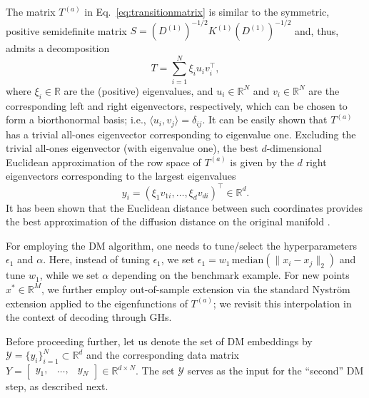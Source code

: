 \documentclass{article}
\begin{document}
The matrix $T^{(a)}$ in Eq.~\eqref{eq:transitionmatrix} is similar to the symmetric, positive semidefinite matrix $S=\left(D^{(1)}\right)^{-1/2} K^{(1)} \left(D^{(1)}\right)^{-1/2}$ and, thus, admits a decomposition
\begin{equation}
T=\sum_{i=1}^N \xi_i u_i v_{i}^\top, 
\end{equation}
where $\xi_i \in \mathbb{R}$ are the (positive) eigenvalues, and $u_i \in \mathbb{R}^N$ and $v_i \in \mathbb{R}^N$ are the corresponding left and right eigenvectors, respectively, which can be chosen to form a biorthonormal basis; i.e., $\langle u_i,v_{j} \rangle = \delta_{ij}$. It can be easily shown that $T^{(a)}$ has a trivial all-ones eigenvector corresponding to eigenvalue one. Excluding the trivial all-ones eigenvector (with eigenvalue one), the best $d$-dimensional Euclidean approximation of the row space of $T^{(a)}$ is given by the $d$ right eigenvectors corresponding to the largest eigenvalues %
\begin{equation}
y_i = (\xi_1 v_{1i}, \dots, \xi_d v_{di})^\top  \in \mathbb{R}^d.
\label{eq:DMcoords}
\end{equation}
It has been shown that the Euclidean distance between such coordinates provides the best approximation of the diffusion distance on the original manifold \cite{nadler2006diffusion}. 

For employing the DM algorithm, one needs to tune/select the hyperparameters $\epsilon_1$ and $\alpha$. Here, instead of tuning $\epsilon_1$, we set $\epsilon_1=w_1\, \text{median}(\|x_i-x_j\|_2)$ and tune $w_1$, while we set $\alpha$ depending on the benchmark example. For new points $x^*\in\mathbb{R}^M$, we further employ  out-of-sample extension via the standard Nystr\"{o}m extension \cite{coifman2006geometric} applied to the eigenfunctions of $T^{(a)}$; we revisit this interpolation in the context of decoding through GHs.

Before proceeding further, let us denote the set of DM embeddings by $\mathcal{Y}=\{ y_i \}_{i=1}^N \subset \mathbb{R}^d$ and the corresponding data matrix $Y = \begin{bmatrix} y_1, & \ldots, & y_N \end{bmatrix} \in \mathbb{R}^{d \times N}$. %
The set $\mathcal{Y}$ serves as the input for the ``second'' DM step, as described next. 
\end{document}
